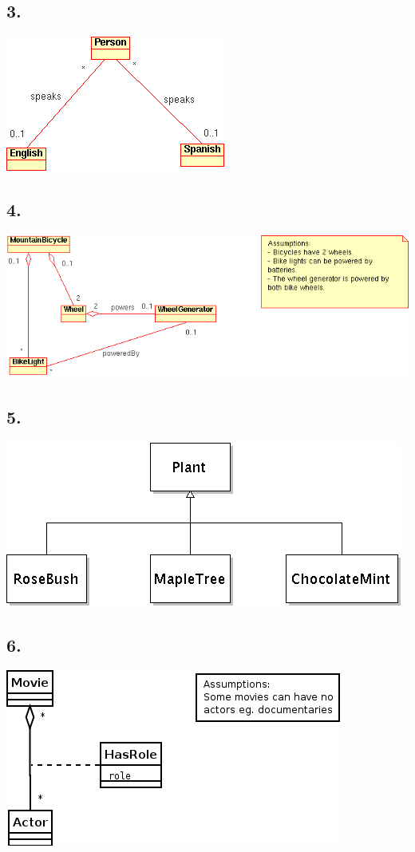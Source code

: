 \documentclass{article}[12pt]
\begin{document}
\subsection*{3.}
\includegraphics[scale=0.6]{a2q2c.png}

\subsection*{4.}
\includegraphics[scale=0.6]{a2q2d.png}

\subsection*{5.}
\includegraphics[scale=0.4]{a2q2e.png}

\subsection*{6.}
\includegraphics[scale=0.4]{a2q2f.png}
\end{document}
